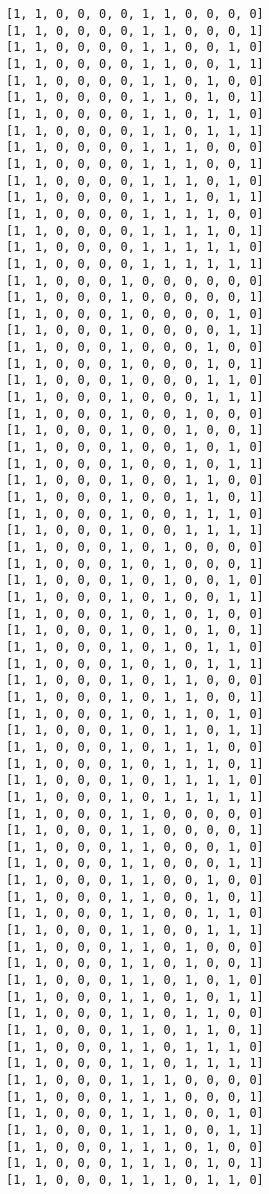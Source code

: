 \documentclass[11pt]{article}
\begin{document}
\begin{Verbatim}[commandchars=\\\{\}]
[1, 1, 0, 0, 0, 0, 1, 1, 0, 0, 0, 0]
[1, 1, 0, 0, 0, 0, 1, 1, 0, 0, 0, 1]
[1, 1, 0, 0, 0, 0, 1, 1, 0, 0, 1, 0]
[1, 1, 0, 0, 0, 0, 1, 1, 0, 0, 1, 1]
[1, 1, 0, 0, 0, 0, 1, 1, 0, 1, 0, 0]
[1, 1, 0, 0, 0, 0, 1, 1, 0, 1, 0, 1]
[1, 1, 0, 0, 0, 0, 1, 1, 0, 1, 1, 0]
[1, 1, 0, 0, 0, 0, 1, 1, 0, 1, 1, 1]
[1, 1, 0, 0, 0, 0, 1, 1, 1, 0, 0, 0]
[1, 1, 0, 0, 0, 0, 1, 1, 1, 0, 0, 1]
[1, 1, 0, 0, 0, 0, 1, 1, 1, 0, 1, 0]
[1, 1, 0, 0, 0, 0, 1, 1, 1, 0, 1, 1]
[1, 1, 0, 0, 0, 0, 1, 1, 1, 1, 0, 0]
[1, 1, 0, 0, 0, 0, 1, 1, 1, 1, 0, 1]
[1, 1, 0, 0, 0, 0, 1, 1, 1, 1, 1, 0]
[1, 1, 0, 0, 0, 0, 1, 1, 1, 1, 1, 1]
[1, 1, 0, 0, 0, 1, 0, 0, 0, 0, 0, 0]
[1, 1, 0, 0, 0, 1, 0, 0, 0, 0, 0, 1]
[1, 1, 0, 0, 0, 1, 0, 0, 0, 0, 1, 0]
[1, 1, 0, 0, 0, 1, 0, 0, 0, 0, 1, 1]
[1, 1, 0, 0, 0, 1, 0, 0, 0, 1, 0, 0]
[1, 1, 0, 0, 0, 1, 0, 0, 0, 1, 0, 1]
[1, 1, 0, 0, 0, 1, 0, 0, 0, 1, 1, 0]
[1, 1, 0, 0, 0, 1, 0, 0, 0, 1, 1, 1]
[1, 1, 0, 0, 0, 1, 0, 0, 1, 0, 0, 0]
[1, 1, 0, 0, 0, 1, 0, 0, 1, 0, 0, 1]
[1, 1, 0, 0, 0, 1, 0, 0, 1, 0, 1, 0]
[1, 1, 0, 0, 0, 1, 0, 0, 1, 0, 1, 1]
[1, 1, 0, 0, 0, 1, 0, 0, 1, 1, 0, 0]
[1, 1, 0, 0, 0, 1, 0, 0, 1, 1, 0, 1]
[1, 1, 0, 0, 0, 1, 0, 0, 1, 1, 1, 0]
[1, 1, 0, 0, 0, 1, 0, 0, 1, 1, 1, 1]
[1, 1, 0, 0, 0, 1, 0, 1, 0, 0, 0, 0]
[1, 1, 0, 0, 0, 1, 0, 1, 0, 0, 0, 1]
[1, 1, 0, 0, 0, 1, 0, 1, 0, 0, 1, 0]
[1, 1, 0, 0, 0, 1, 0, 1, 0, 0, 1, 1]
[1, 1, 0, 0, 0, 1, 0, 1, 0, 1, 0, 0]
[1, 1, 0, 0, 0, 1, 0, 1, 0, 1, 0, 1]
[1, 1, 0, 0, 0, 1, 0, 1, 0, 1, 1, 0]
[1, 1, 0, 0, 0, 1, 0, 1, 0, 1, 1, 1]
[1, 1, 0, 0, 0, 1, 0, 1, 1, 0, 0, 0]
[1, 1, 0, 0, 0, 1, 0, 1, 1, 0, 0, 1]
[1, 1, 0, 0, 0, 1, 0, 1, 1, 0, 1, 0]
[1, 1, 0, 0, 0, 1, 0, 1, 1, 0, 1, 1]
[1, 1, 0, 0, 0, 1, 0, 1, 1, 1, 0, 0]
[1, 1, 0, 0, 0, 1, 0, 1, 1, 1, 0, 1]
[1, 1, 0, 0, 0, 1, 0, 1, 1, 1, 1, 0]
[1, 1, 0, 0, 0, 1, 0, 1, 1, 1, 1, 1]
[1, 1, 0, 0, 0, 1, 1, 0, 0, 0, 0, 0]
[1, 1, 0, 0, 0, 1, 1, 0, 0, 0, 0, 1]
[1, 1, 0, 0, 0, 1, 1, 0, 0, 0, 1, 0]
[1, 1, 0, 0, 0, 1, 1, 0, 0, 0, 1, 1]
[1, 1, 0, 0, 0, 1, 1, 0, 0, 1, 0, 0]
[1, 1, 0, 0, 0, 1, 1, 0, 0, 1, 0, 1]
[1, 1, 0, 0, 0, 1, 1, 0, 0, 1, 1, 0]
[1, 1, 0, 0, 0, 1, 1, 0, 0, 1, 1, 1]
[1, 1, 0, 0, 0, 1, 1, 0, 1, 0, 0, 0]
[1, 1, 0, 0, 0, 1, 1, 0, 1, 0, 0, 1]
[1, 1, 0, 0, 0, 1, 1, 0, 1, 0, 1, 0]
[1, 1, 0, 0, 0, 1, 1, 0, 1, 0, 1, 1]
[1, 1, 0, 0, 0, 1, 1, 0, 1, 1, 0, 0]
[1, 1, 0, 0, 0, 1, 1, 0, 1, 1, 0, 1]
[1, 1, 0, 0, 0, 1, 1, 0, 1, 1, 1, 0]
[1, 1, 0, 0, 0, 1, 1, 0, 1, 1, 1, 1]
[1, 1, 0, 0, 0, 1, 1, 1, 0, 0, 0, 0]
[1, 1, 0, 0, 0, 1, 1, 1, 0, 0, 0, 1]
[1, 1, 0, 0, 0, 1, 1, 1, 0, 0, 1, 0]
[1, 1, 0, 0, 0, 1, 1, 1, 0, 0, 1, 1]
[1, 1, 0, 0, 0, 1, 1, 1, 0, 1, 0, 0]
[1, 1, 0, 0, 0, 1, 1, 1, 0, 1, 0, 1]
[1, 1, 0, 0, 0, 1, 1, 1, 0, 1, 1, 0]

\end{Verbatim}
\end{document}

